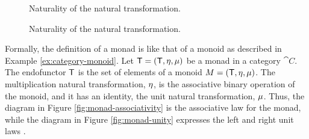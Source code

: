 \begin{definition}
\begin{figure}[htbp]
\begin{center}
    \end{center}
    \caption{Naturality of the \nat{\eta} natural transformation.}
    \label{fig:monad-naturality-unit}
  \end{figure}

  \begin{figure}[htbp]
    \begin{center}
    \end{center}
    \caption{Naturality of the \nat{\mu} natural transformation.}
    \label{fig:monad-naturality-multiplication}
  \end{figure}

\end{definition}

\begin{remark}
  \label{re:monad-monoid}

  Formally, the definition of a monad is like that of a monoid as
  described in Example \ref{ex:category-monoid}. Let $\mathsf{T} =
  (\mathsf{T}, \eta, \mu)$ be a monad in a category
  $\cat{C}$. The endofunctor $\mathsf{T}$ is the set of elements of a
  monoid $M = (\mathsf{T}, \eta, \mu)$. The multiplication
  natural transformation, $\eta$, is the associative binary
  operation of the monoid, and it has an identity, the unit natural
  transformation, $\mu$. Thus, the diagram in Figure
  \ref{fig:monad-associativity} is the associative law for the monad,
  while the diagram in Figure \ref{fig:monad-unity} expresses the left
  and right unit laws \parencite[138]{maclane-1998}.

\end{remark}

